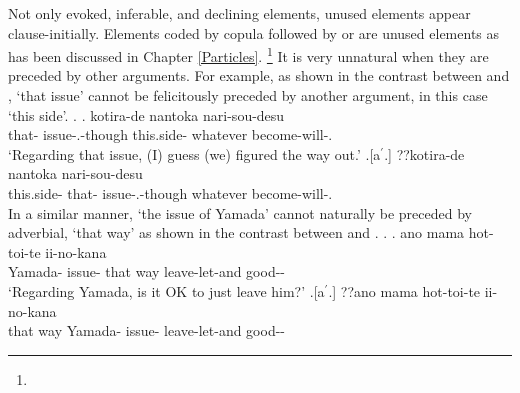 Not only evoked, inferable, and declining elements,
unused elements appear clause-initially.
Elements coded by copula followed by  or  are unused elements as has been discussed in Chapter \ref{Particles}.%
 \footnote{
 }
It is very unnatural when they are preceded by other arguments.
For example,
as shown in the contrast between \Next[a] and \Next[b],
 `that issue' cannot be felicitously preceded by another argument, in this case  `this side'.
%
\ex.
 \ag.   kotira-de nantoka nari-sou-desu \\
      that- issue-.-though this.side- whatever become-will-. \\
      `Regarding that issue, (I) guess (we) figured the way out.'
      \hfill{\cite[modified from][283]{niwa06}}
 \bg.[a$^{\prime}$.] ??kotira-de   nantoka nari-sou-desu \\
      this.side- that- issue-.-though whatever become-will-. \\

In a similar manner,
 `the issue of Yamada' cannot naturally be preceded by adverbial,  `that way'
as shown in the contrast between \Next[a] and \Next[b].
%
\ex.
 \ag.   ano mama hot-toi-te ii-no-kana \\
      Yamada- issue- that way leave-let-and good-- \\
      `Regarding Yamada, is it OK to just leave him?'
      \hfill{\cite[283]{niwa06}}
 \bg.[a$^{\prime}$.] ??ano mama   hot-toi-te ii-no-kana \\
      that way Yamada- issue- leave-let-and good-- \\


